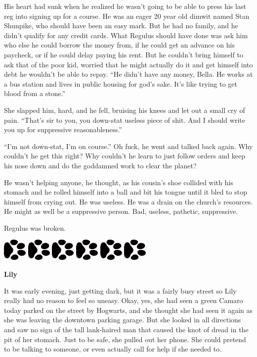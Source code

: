 \documentclass[12pt,twoside,openright]{memoir}
\newcommand{\myrulez}{	
	\begin{center}
		\hspace{.5em}
		\includegraphics[angle=60]{dogprint.pdf}
		\hspace{.5em}
		\includegraphics[angle=120]{dogprint.pdf}
		\hspace{.5em}
		\includegraphics[angle=60]{dogprint.pdf}
		\hspace{.5em}
		\includegraphics[angle=120]{dogprint.pdf}
		\hspace{.5em}
		\includegraphics[angle=60]{dogprint.pdf}
		\hspace{.5em}
		\includegraphics[angle=120]{dogprint.pdf}
		\hspace{.5em}
	\end{center}
}
\begin{document}
His heart had sunk when he realized he wasn't going to be able to press his last reg into signing up for a course. He was an eager 20 year old dimwit named Stan Shunpike, who should have been an easy mark. But he had no family, and he didn't qualify for any credit cards. What Regulus should have done was ask him who else he could borrow the money from, if he could get an advance on his paycheck, or if he could delay paying his rent. But he couldn't bring himself to ask that of the poor kid, worried that he might actually do it and get himself into debt he wouldn't be able to repay. ``He didn't have any money, Bella. He works at a bus station and lives in public housing for god's sake. It's like trying to get blood from a stone.''

She slapped him, hard, and he fell, bruising his knees and let out a small cry of pain. ``That's sir to you, you down-stat useless piece of shit. And I should write you up for suppressive reasonableness.''

``I'm not down-stat, I'm on course.'' Oh fuck, he went and talked back again. Why couldn't he get this right? Why couldn't he learn to just follow orders and keep his nose down and do the goddamned work to clear the planet?

He wasn't helping anyone, he thought, as his cousin's shoe collided with his stomach and he rolled himself into a ball and bit his tongue until it bled to stop himself from crying out. He was useless. He was a drain on the church's resources. He might as well be a suppressive person. Bad, useless, pathetic, suppressive.

Regulus was broken.

\myrulez

\textbf{Lily} 

It was early evening, just getting dark, but it was a fairly busy street so Lily really had no reason to feel so uneasy. Okay, yes, she had seen a green Camaro today parked on the street by Hogwarts, and she thought she had seen it again as she was leaving the downtown parking garage. But she looked in all directions and saw no sign of the tall lank-haired man that caused the knot of dread in the pit of her stomach. Just to be safe, she pulled out her phone. She could pretend to be talking to someone, or even actually call for help if she needed to.
\end{document}
